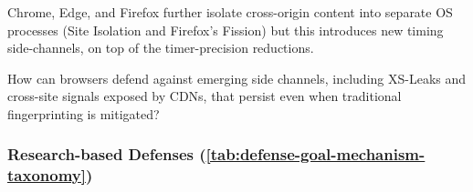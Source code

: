 %
Chrome, Edge, and Firefox further isolate cross-origin content into separate OS processes (Site Isolation and Firefox's Fission) but this introduces new timing side-channels, on top of the timer-precision reductions.


\begin{opbox}
How can browsers defend against emerging side channels, including XS-Leaks and cross-site signals exposed by CDNs, that persist even when traditional fingerprinting is mitigated? 
\end{opbox}




\subsubsection{Research-based Defenses (\autoref{tab:defense-goal-mechanism-taxonomy})}
\label{sec:stateless-defenses-research}



